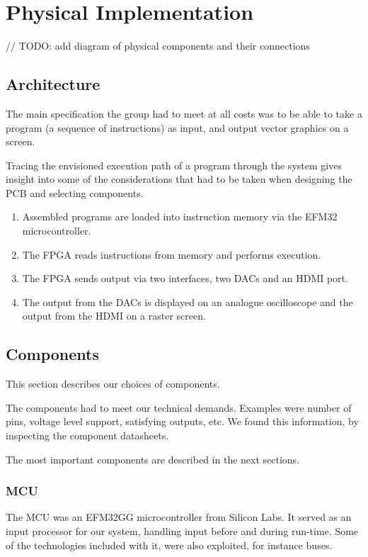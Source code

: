 \chapter{Physical Implementation}

// TODO: add diagram of physical components and their connections

\section{Architecture}
The main specification the group had to meet at all costs was to be able to take a program (a sequence of instructions) as input, and output vector graphics on a screen.

Tracing the envisioned execution path of a program through the system gives insight into some of the considerations that had to be taken when designing the PCB and selecting components.

\begin{enumerate}
\item Assembled \vthreek programs are loaded into instruction memory via the EFM32 microcontroller.
\item The FPGA reads instructions from memory and performs execution.
\item The FPGA sends output via two interfaces, two DACs and an HDMI port.
\item The output from the DACs is displayed on an analogue oscilloscope and the output from the HDMI on a raster screen.
\end{enumerate}

\section{Components}
This section describes our choices of components.

The components had to meet our technical demands. Examples were number of pins, voltage level support, satisfying outputs, etc. We found this information, by inspecting the component datasheets.

The most important components are described in the next sections.

\subsection{MCU}
The MCU was an EFM32GG microcontroller from Silicon Labs. It served as an input processor for our system, handling input before and during run-time. Some of the technologies included with it, were also exploited, for instance buses.

